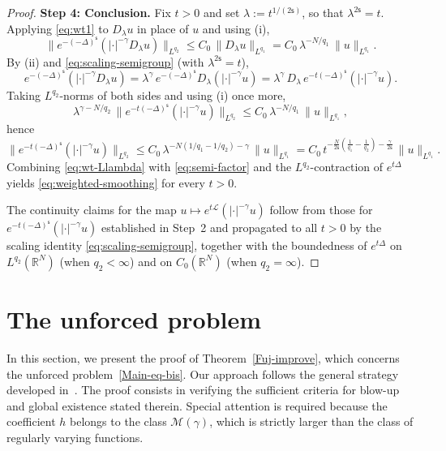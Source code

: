 \documentclass[12pt,reqno]{amsart}
\theoremstyle{plain}
\theoremstyle{definition}
\theoremstyle{remark}
\numberwithin{equation}{section}
\newcommand{\ts}{\mathsf{s}}
\begin{document}
\begin{proof}
\medskip
\noindent\textbf{Step 4: Conclusion.}
Fix $t>0$ and set $\lambda:=t^{1/(2\ts)}$, so that $\lambda^{2\ts}=t$. Applying \eqref{eq:wt1} to $D_{\lambda}u$ in place of $u$ and using (i),
\begin{equation}\label{eq:wt1-rescaled}
\bigl\|e^{-(-\Delta)^{\ts}}(|\cdot|^{-\gamma}D_{\lambda}u)\bigr\|_{L^{q_{2}}}
\leq C_{0}\,\|D_{\lambda}u\|_{L^{q_{1}}}
=C_{0}\,\lambda^{-N/q_{1}}\,\|u\|_{L^{q_{1}}}.
\end{equation}
By (ii) and \eqref{eq:scaling-semigroup} (with $\lambda^{2\ts}=t$),
\[
e^{-(-\Delta)^{\ts}}(|\cdot|^{-\gamma}D_{\lambda}u)
=\lambda^{\gamma}\,e^{-(-\Delta)^{\ts}}D_{\lambda}(|\cdot|^{-\gamma}u)
=\lambda^{\gamma}\,D_{\lambda}\,e^{-t(-\Delta)^{\ts}}(|\cdot|^{-\gamma}u).
\]
Taking $L^{q_{2}}$-norms of both sides and using (i) once more,
\[
\lambda^{\gamma-N/q_{2}}\,\bigl\|e^{-t(-\Delta)^{\ts}}(|\cdot|^{-\gamma}u)\bigr\|_{L^{q_{2}}}
\leq C_{0}\,\lambda^{-N/q_{1}}\,\|u\|_{L^{q_{1}}},
\]
hence
\begin{equation}\label{eq:wt-Llambda}
\bigl\|e^{-t(-\Delta)^{\ts}}(|\cdot|^{-\gamma}u)\bigr\|_{L^{q_{2}}}
\leq C_{0}\,\lambda^{-N(1/q_{1}-1/q_{2})-\gamma}\,\|u\|_{L^{q_{1}}}
=C_{0}\,t^{-\frac{N}{2\ts}\left(\frac{1}{q_{1}}-\frac{1}{q_{2}}\right)-\frac{\gamma}{2\ts}}\,\|u\|_{L^{q_{1}}}.
\end{equation}
Combining \eqref{eq:wt-Llambda} with \eqref{eq:semi-factor} and the $L^{q_{2}}$-contraction of $e^{t\Delta}$ yields \eqref{eq:weighted-smoothing} for every $t>0$.

The continuity claims for the map $u\mapsto e^{t\mathscr{L}}(|\cdot|^{-\gamma}u)$ follow from those for $e^{-t(-\Delta)^{\ts}}(|\cdot|^{-\gamma}u)$ established in Step~2 and propagated to all $t>0$ by the scaling identity \eqref{eq:scaling-semigroup}, together with the boundedness of $e^{t\Delta}$ on $L^{q_{2}}(\mathbb{R}^{N})$ (when $q_{2}<\infty$) and on $C_{0}(\mathbb{R}^{N})$ (when $q_{2}=\infty$).
\end{proof}


\section{The unforced problem}
\label{Unforced}
In this section, we present the proof of Theorem~\ref{Fuj-improve}, which concerns the unforced problem~\eqref{Main-eq-bis}.  
Our approach follows the general strategy developed in~\cite[Theorem~6]{Migu-2025}. The proof consists in verifying the sufficient criteria for blow-up and global existence stated therein. Special attention is required because the coefficient $h$ belongs to the class $\mathcal M(\gamma)$, which is strictly larger than the class of regularly varying functions.
\end{document}
